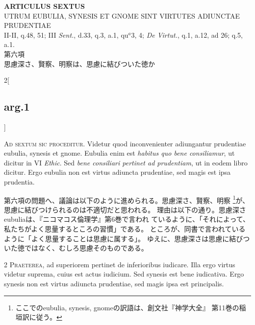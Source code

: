 \documentclass[paper=a4paper,fontsize=10pt,jafontsize=9pt,titlepage]{jlreq}
\begin{document}
{}
\setcounter{section}{6}
\setcounter{subsection}{0}
\begin{center}
 {\Large {\bfseries ARTICULUS SEXTUS}}\\ {\large UTRUM EUBULIA, SYNESIS ET
 GNOME SINT VIRTUTES ADIUNCTAE PRUDENTIAE}\\ {\footnotesize II-II,
 q.48, 51; III {\itshape Sent.}, d.33, q.3, a.1, qu$^{a}$3, 4;
 {\itshape De Virtut.}, q.1, a.12, ad 26; q.5, a.1.}\\ {\Large 第六項\\
 思慮深さ、賢察、明察は、思慮に結びついた徳か}
\end{center}

\begin{paracol}{2}[\subsection{arg.1}]

{\huge A}{\scshape d sextum sic proceditur}. Videtur quod
inconvenienter adiungantur prudentiae eubulia, synesis et
gnome. Eubulia enim est {\itshape habitus quo bene consiliamur}, ut
dicitur in VI {\itshape Ethic}. Sed {\itshape bene consiliari pertinet
ad prudentiam}, ut in eodem libro dicitur. Ergo eubulia non est virtus
adiuncta prudentiae, sed magis est ipsa prudentia.

\switchcolumn

第六項の問題へ、議論は以下のように進められる。思慮深さ、賢察、明察
\footnote{ここでのeubulia, synesis, gnomeの訳語は、創文社『神学大全』
第11巻の稲垣訳に従う。}が、思慮に結びつけられるのは不適切だと思われる。
理由は以下の通り。思慮深さeubuliaは、『ニコマコス倫理学』第6巻で言われ
ているように、「それによって、私たちがよく思量するところの習慣」である。
ところが、同書で言われているように「よく思量することは思慮に属する」。
ゆえに、思慮深さは思慮に結びついた徳ではなく、むしろ思慮そのものである。


{\scshape 2 Praeterea}, ad superiorem pertinet de inferioribus
iudicare. Illa ergo virtus videtur suprema, cuius est actus
iudicium. Sed synesis est bene iudicativa. Ergo synesis non est virtus
adiuncta prudentiae, sed magis ipsa est principalis.


\end{paracol}
\end{document}
